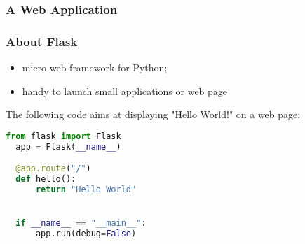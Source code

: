 \begin{frame}
  \frametitle{A Web Application}
\end{frame}

\begin{frame}[fragile, shrink = 20]
  \frametitle{About Flask}

  \begin{itemize}
    \item micro web framework for Python;
    \item handy to launch small applications or web page
  \end{itemize}

The following code aims at displaying "Hello World!" on a web page: 

\begin{lstlisting}[language=Python]
  from flask import Flask
  app = Flask(__name__)

  @app.route("/")
  def hello():
      return "Hello World"


  if __name__ == "__main__":
      app.run(debug=False)
\end{lstlisting}

\end{frame}
